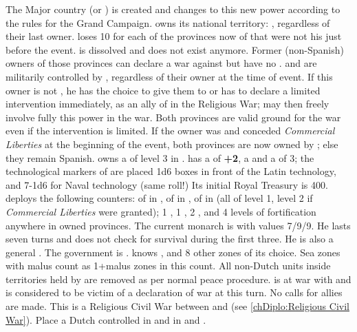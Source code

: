 
\phevnt
\aparag The Major country \paysmajeurHollande (or \HOL) is created and
\MAJHOLx changes to this new power according to the rules for the Grand
Campaign.
\aparag \HOL owns its national territory: ,
regardless of their last owner. \SPA loses 10 \VP for each of the provinces
now of \HOL that were not his just before the event. \paysprovincesne is
dissolved and does not exist anymore.
\bparag Former (non-Spanish) owners of those provinces can declare a war
against \HOL but have no \CB.
\aparag\label{onlyfirstrevolt1} \provinceBrabant and \provinceLimburg are
militarily controlled by \HOL, regardless of their owner at the time of event.
\bparag If this owner is not \SPA, he has the choice to give them to \HOL or
has to declare a limited intervention immediately, as an ally of \SPA in the
Religious War; \HOL may then freely involve fully this power in the war. Both
provinces are valid ground for the war even if the intervention is limited.
\bparag If the owner was \SPA and \SPA conceded \emph{Commercial Liberties} at
the beginning of the event, both provinces are now owned by \HOL; else they
remain Spanish.
\aparag \SPA owns a \Presidio of level 3 in \provinceZeeland.
\aparag \HOL has a \STAB of {\bf +2}, a \DTI and a \FTI of 3; the
technological markers of \HOL are placed 1d6 boxes in front of the Latin
technology, and 7-1d6 for Naval technology (same roll!) Its initial Royal
Treasury is 400\ducats.
\aparag \HOL deploys the following counters: \MNU of  in
\provinceZeeland, of  in \provinceUtrecht, of  in
\provinceGelderland (all of level 1, level 2 if \emph{Commercial Liberties}
were granted); 1 \ARMY\facemoins, 1 \FLEET\faceplus, 2 \DT, and 4 levels of
fortification anywhere in owned provinces.
\aparag\label{onlyfirstrevolt2} The current \HOL monarch is
 with values 7/9/9. He lasts seven turns and does not check
for survival during the first three. He is also a general
. The government is .
\aparag\label{onlyfirstrevolt3} \HOL knows
\seazoneAcores, \seazoneCanarias and 8 other zones of its choice. Sea zones
with malus count as 1+malus zones in this count.
\aparag All non-Dutch units inside territories held by \HOL are removed as per
normal peace procedure.
\aparag \HOL is at war with \SPA and \SPA is considered to be victim of a
declaration of war at this turn. No calls for allies are made.  This is a
Religious Civil War between \HOL and \SPA (see \ref{chDiplo:Religious Civil
  War}).
\aparag\label{onlyfirstrevolt4} Place a Dutch controlled \REVOLT \faceplus in
\provinceVlaanderen and \REVOLT \facemoins in \provinceFlandre and
\provinceHainaut.

